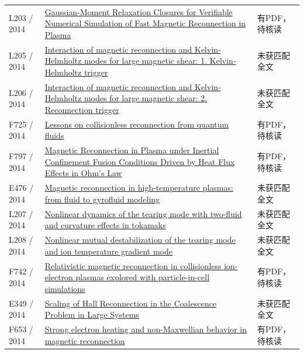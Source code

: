 \begin{longtable}{P{24mm}P{97mm}P{27mm}}
L203 / 2014 & \href{https://doi.org/10.48550/arxiv.1409.6985}{Gaussian-Moment Relaxation Closures for Verifiable Numerical Simulation of Fast Magnetic Reconnection in Plasma} & 有PDF，待核读\\

L205 / 2014 & \href{https://doi.org/10.1002/2013ja019224}{Interaction of magnetic reconnection and Kelvin‐Helmholtz modes for large magnetic shear: 1. Kelvin‐Helmholtz trigger} & 未获匹配全文\\

L206 / 2014 & \href{https://doi.org/10.1002/2013ja019225}{Interaction of magnetic reconnection and Kelvin‐Helmholtz modes for large magnetic shear: 2. Reconnection trigger} & 未获匹配全文\\

F725 / 2014 & \href{https://doi.org/10.3389/fphy.2014.00076}{Lessons on collisionless reconnection from quantum fluids} & 有PDF，待核读\\

F797 / 2014 & \href{https://doi.org/10.1103/physrevlett.112.105004}{Magnetic Reconnection in Plasma under Inertial Confinement Fusion Conditions Driven by Heat Flux Effects in Ohm’s Law} & 有PDF，待核读\\

E476 / 2014 & \href{http://hdl.handle.net/11583/2536090}{Magnetic reconnection in high-temperature plasmas: from fluid to gyrofluid modeling} & 未获匹配全文\\

L207 / 2014 & \href{https://doi.org/10.1063/1.4863498}{Nonlinear dynamics of the tearing mode with two-fluid and curvature effects in tokamaks} & 未获匹配全文\\

L208 / 2014 & \href{https://doi.org/10.1088/0029-5515/54/12/123018}{Nonlinear mutual destabilization of the tearing mode and ion temperature gradient mode} & 未获匹配全文\\

F742 / 2014 & \href{https://doi.org/10.1051/0004-6361/201424083}{Relativistic magnetic reconnection in collisionless ion-electron plasmas explored with particle-in-cell simulations} & 有PDF，待核读\\

E349 / 2014 & \href{http://absimage.aps.org/image/DPP14/MWS_DPP14-2014-001290.pdf}{Scaling of Hall Reconnection in the Coalescence Problem in Large Systems} & 未获匹配全文\\

F653 / 2014 & \href{https://doi.org/10.1186/bf03353282}{Strong electron heating and non-Maxwellian behavior in magnetic reconnection} & 有PDF，待核读\\


\end{longtable}
